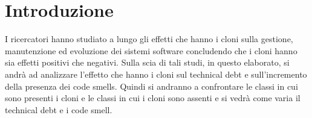 \chapter{Introduzione}\label{cap2}
I ricercatori hanno studiato a lungo gli effetti che hanno i cloni sulla gestione, manutenzione ed evoluzione dei sistemi software concludendo che i cloni hanno sia effetti positivi che negativi. Sulla scia di tali studi, in questo elaborato, si andrà ad analizzare l'effetto che hanno i cloni sul technical debt e sull'incremento della presenza dei code smells. Quindi si andranno a confrontare le classi in cui sono presenti i cloni e le classi in cui i cloni sono assenti e si vedrà come varia il technical debt e i code smell. 



